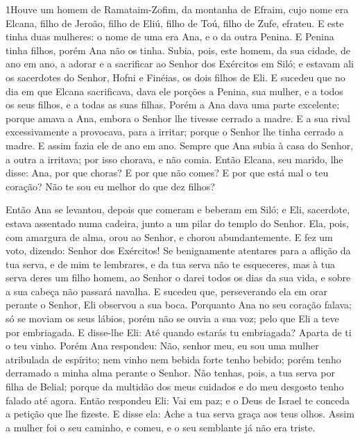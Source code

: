 
\lettrine{1} Houve um homem de Ramataim-Zofim, da montanha de
Efraim, cujo nome era Elcana, filho de Jeroão, filho de Eliú, filho
de Toú, filho de Zufe, efrateu. E este tinha duas mulheres: o
nome de uma era Ana, e o da outra Penina. E Penina tinha filhos,
porém Ana não os tinha. Subia, pois, este homem, da sua cidade,
de ano em ano, a adorar e a sacrificar ao Senhor dos Exércitos em
Siló; e estavam ali os sacerdotes do Senhor, Hofni e Finéias, os
dois filhos de Eli. E sucedeu que no dia em que Elcana
sacrificava, dava ele porções a Penina, sua mulher, e a todos os
seus filhos, e a todas as suas filhas. Porém a Ana dava uma
parte excelente; porque amava a Ana, embora o Senhor lhe tivesse
cerrado a madre. E a sua rival excessivamente a provocava, para
a irritar; porque o Senhor lhe tinha cerrado a madre. E assim
fazia ele de ano em ano. Sempre que Ana subia à casa do Senhor, a
outra a irritava; por isso chorava, e não comia. Então Elcana,
seu marido, lhe disse: Ana, por que choras? E por que não comes? E
por que está mal o teu coração? Não te sou eu melhor do que dez
filhos?

Então Ana se levantou, depois que comeram e beberam em Siló; e
Eli, sacerdote, estava assentado numa cadeira, junto a um pilar do
templo do Senhor. Ela, pois, com amargura de alma, orou ao
Senhor, e chorou abundantemente. E fez um voto, dizendo:
Senhor dos Exércitos! Se benignamente atentares para a aflição da
tua serva, e de mim te lembrares, e da tua serva não te esqueceres,
mas à tua serva deres um filho homem, ao Senhor o darei todos os
dias da sua vida, e sobre a sua cabeça não passará navalha. E
sucedeu que, perseverando ela em orar perante o Senhor, Eli observou
a sua boca. Porquanto Ana no seu coração falava; só se moviam
os seus lábios, porém não se ouvia a sua voz; pelo que Eli a teve
por embriagada. E disse-lhe Eli: Até quando estarás tu
embriagada? Aparta de ti o teu vinho. Porém Ana respondeu:
Não, senhor meu, eu sou uma mulher atribulada de espírito; nem vinho
nem bebida forte tenho bebido; porém tenho derramado a minha alma
perante o Senhor. Não tenhas, pois, a tua serva por filha de
Belial; porque da multidão dos meus cuidados e do meu desgosto tenho
falado até agora. Então respondeu Eli: Vai em paz; e o Deus
de Israel te conceda a petição que lhe fizeste. E disse ela:
Ache a tua serva graça aos teus olhos. Assim a mulher foi o seu
caminho, e comeu, e o seu semblante já não era triste.


